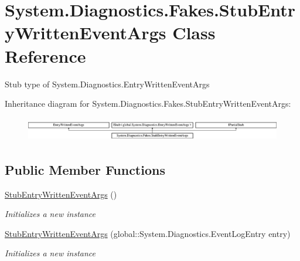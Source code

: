 \hypertarget{class_system_1_1_diagnostics_1_1_fakes_1_1_stub_entry_written_event_args}{\section{System.\-Diagnostics.\-Fakes.\-Stub\-Entry\-Written\-Event\-Args Class Reference}
\label{class_system_1_1_diagnostics_1_1_fakes_1_1_stub_entry_written_event_args}
}


Stub type of System.\-Diagnostics.\-Entry\-Written\-Event\-Args 


Inheritance diagram for System.\-Diagnostics.\-Fakes.\-Stub\-Entry\-Written\-Event\-Args\-:\begin{figure}[H]
\begin{center}
\leavevmode
\includegraphics[height=1.063628cm]{class_system_1_1_diagnostics_1_1_fakes_1_1_stub_entry_written_event_args}
\end{center}
\end{figure}
\subsection*{Public Member Functions}
\begin{DoxyCompactItemize}
\item 
\hyperlink{class_system_1_1_diagnostics_1_1_fakes_1_1_stub_entry_written_event_args_a67228fbd0f1c3bc6b0bb0fb3e847404d}{Stub\-Entry\-Written\-Event\-Args} ()
\begin{DoxyCompactList}\small\item\em Initializes a new instance\end{DoxyCompactList}\item 
\hyperlink{class_system_1_1_diagnostics_1_1_fakes_1_1_stub_entry_written_event_args_a88cf1e7f39db0063a4ef86acf077c6cc}{Stub\-Entry\-Written\-Event\-Args} (global\-::\-System.\-Diagnostics.\-Event\-Log\-Entry entry)
\begin{DoxyCompactList}\small\item\em Initializes a new instance\end{DoxyCompactList}\end{DoxyCompactItemize}
